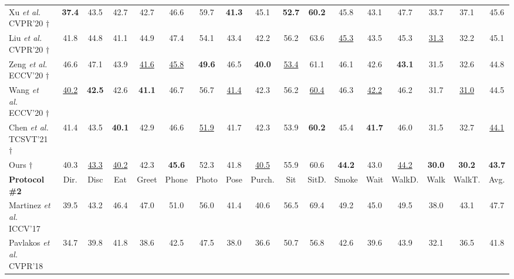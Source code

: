 \documentclass[journal]{IEEEtran}
\begin{document}
\begin{table*}[t]
{\begin{tabular}{@{}l|ccccccccccccccc|c@{}}
Xu \emph{et al.}~\cite{xu2020deep} CVPR'20 $\dag$& \textbf{37.4} & {43.5}& 42.7& {42.7}& 46.6& 59.7& \textbf{41.3} &45.1 &\textbf{52.7} &\textbf{60.2} & 45.8& 43.1& 47.7& 33.7& 37.1& 45.6 \\
   
Liu \emph{et al.}~\cite{liu2020attention} CVPR'20  $\dag$ &41.8 &44.8 &{41.1} &44.9 &47.4 &54.1 &43.4 &42.2 &56.2 &63.6 &\underline{45.3} &43.5 &{45.3} &\underline{31.3} &32.2 &45.1 \\

Zeng \emph{et al.}~\cite{zeng2020srnet} ECCV'20  $\dag$& 46.6& 47.1& 43.9& \underline{41.6}& \underline{45.8} & \textbf{49.6} & 46.5& \textbf{40.0}&\underline{53.4} & 61.1& 46.1& 42.6& \textbf{43.1}& 31.5& 32.6& 44.8 \\

Wang \emph{et al.}~\cite{wang2020motion} ECCV'20  $\dag$ &\underline{40.2} &\textbf{42.5} &42.6 &\textbf{41.1} &46.7 &56.7 &\underline{41.4} &42.3 &56.2 &\underline{60.4} &46.3 &\underline{42.2} &46.2 &31.7 &\underline{31.0} &44.5 \\

Chen \emph{et al.}~\cite{chen2021anatomy} TCSVT'21  $\dag$ &41.4 &{43.5} &\textbf{40.1} &42.9 &46.6 &\underline{51.9} &41.7 &42.3 &53.9 &\textbf{60.2} &45.4 &\textbf{41.7} &46.0 &31.5 &32.7 &\underline{44.1} \\
      
      \midrule[0.5pt]

      Ours $\dag$ &{40.3} &\underline{43.3} &\underline{40.2} &{42.3} &\textbf{45.6} &{52.3} &{41.8} &\underline{40.5} &{55.9} &{60.6} &\textbf{44.2} &{43.0} &\underline{44.2} &\textbf{30.0} &\textbf{30.2} &\textbf{43.7} \\

      \toprule[1pt]

      \textbf{Protocol \#2} & Dir. & Disc & Eat & Greet & Phone & Photo & Pose & Purch. & Sit & SitD. & Smoke & Wait & WalkD. & Walk & WalkT. & Avg.\\
      \midrule[0.5pt]

Martinez \emph{et al.}~\cite{martinez2017simple} ICCV'17  &39.5 &43.2 &46.4 &47.0 &51.0 &56.0 &41.4 &40.6 &56.5 &69.4 &49.2 &45.0 &49.5 &38.0 &43.1 &47.7 \\

Pavlakos \emph{et al.}~\cite{pavlakos2018ordinal} CVPR'18  &34.7 &39.8 &41.8 &38.6 &42.5 &47.5 &38.0 &36.6 &50.7 &56.8 &42.6 &39.6 &43.9 &32.1 &36.5 &41.8 \\


\end{tabular}}
\end{table*}
\end{document}
